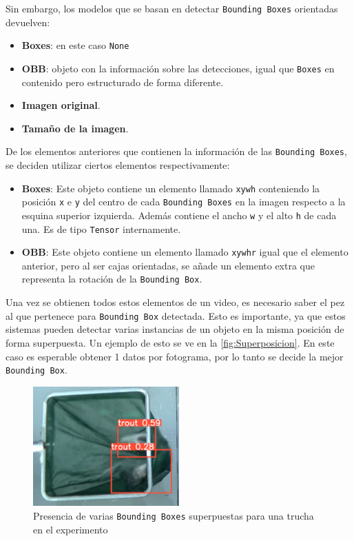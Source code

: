 Sin embargo, los modelos que se basan en detectar \texttt{Bounding Boxes} orientadas devuelven:

\begin{itemize}
    \item \textbf{Boxes}: en este caso \texttt{None}
    \item \textbf{OBB}: objeto con la información sobre las detecciones, igual que \texttt{Boxes} en contenido pero estructurado de forma diferente.
    \item \textbf{Imagen original}.
    \item \textbf{Tamaño de la imagen}.
\end{itemize}

\clearpage

De los elementos anteriores que contienen la información de las \texttt{Bounding Boxes}, se deciden utilizar ciertos elementos respectivamente:
\begin{itemize}
    \item \textbf{Boxes}: Este objeto contiene un elemento llamado \texttt{xywh} conteniendo la posición \texttt{x} e \texttt{y} del centro de cada \texttt{Bounding Boxes} en la imagen respecto a la esquina 
    superior izquierda. Además contiene el ancho \texttt{w} y el alto \texttt{h} de cada una. Es de tipo \texttt{Tensor} internamente.
    \item \textbf{OBB}: Este objeto contiene un elemento llamado \texttt{xywhr} igual que el elemento anterior, pero al ser cajas orientadas, se añade un elemento extra que representa la rotación de la \texttt{Bounding Box}.
\end{itemize}

Una vez se obtienen todos estos elementos de un video, es necesario saber el pez al que pertenece para \texttt{Bounding Box} detectada. Esto es importante, ya que estos sistemas pueden detectar varias instancias de un objeto en la 
misma posición de forma superpuesta. Un ejemplo de esto se ve en la \autoref{fig:Superposicion}. En este caso es esperable obtener 1 datos por fotograma, por lo tanto se decide la mejor \texttt{Bounding Box}.

\begin{figure}[H]
    \centering
    \includegraphics[width=0.5\textwidth]{images/6/6.3/Superposicion.png}
    \caption{Presencia de varias \texttt{Bounding Boxes} superpuestas para una trucha en el experimento}
    \label{fig:Superposicion}
\end{figure}

